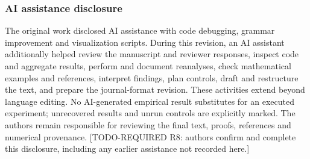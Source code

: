 \documentclass[10pt]{article}
\newcommand{\req}[2]{{\color{brown!75!black}\small[TODO-REQUIRED #1: #2]}}
\begin{document}
\subsubsection*{AI assistance disclosure}
The original work disclosed AI assistance with code debugging, grammar improvement and visualization scripts. During this revision, an AI assistant additionally helped review the manuscript and reviewer responses, inspect code and aggregate results, perform and document reanalyses, check mathematical examples and references, interpret findings, plan controls, draft and restructure the text, and prepare the journal-format revision. These activities extend beyond language editing. No AI-generated empirical result substitutes for an executed experiment; unrecovered results and unrun controls are explicitly marked. The authors remain responsible for reviewing the final text, proofs, references and numerical provenance. \req{R8}{authors confirm and complete this disclosure, including any earlier assistance not recorded here.}



\FloatBarrier
\appendix

\end{document}
